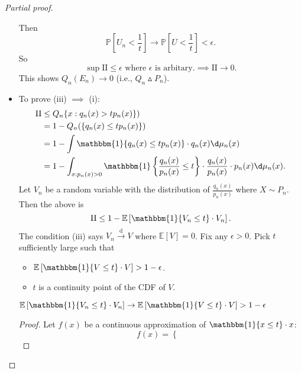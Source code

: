 \documentclass[a4paper]{article}
\begin{document}
\begin{proof}[Partial proof]
\begin{itemize}
\begin{itemize}
		\end{itemize}
		Then
		\begin{equation*}
			\mathbb{P}\left[U_n < \frac{1}{t}\right] \to \mathbb{P}\left[U < \frac{1}{t}\right] < \epsilon.
		\end{equation*}
		So
		\begin{equation*}
			\sup \text{II} \leq \epsilon \text{ where } \epsilon \text{ is arbitary.} \implies \text{II} \to 0.
		\end{equation*}
		This shows $Q_n(E_n) \to 0$ (i.e., $Q_n \vartriangle P_n$).
		\item To prove (iii) $\implies$ (i):
		\begin{equation*}
			\begin{aligned}
				\text{II} &\leq Q_n \{x:q_n(x) > tp_n(x)\}) \\
				&= 1- Q_n(\{q_n(x) \leq tp_n(x)\}) \\
				&= 1- \int \mathbbm{1}\{q_n(x) \leq tp_n(x)\} \cdot q_n(x) \d \mu_n(x) \\
				&= 1- \int_{x:p_n(x) > 0} \mathbbm{1}\left\{\frac{q_n(x)}{p_n(x)} \leq t\right\} \cdot \frac{q_n(x)}{p_n(x)} \cdot p_n(x) \d \mu_n(x).
			\end{aligned}
		\end{equation*}
		Let $V_n$ be a random variable with the distribution of $\frac{q_n(x)}{p_n(x)}$ where $X \sim P_n$. Then the above is
		\begin{equation*}
			\text{II} \leq 1- \mathbb{E}\left[\mathbbm{1}\{V_n \leq t\} \cdot V_n \right].
		\end{equation*}
		The condition (iii) says $V_n \stackrel{\text{d}}{\longrightarrow} V$ where $\mathbb{E}[V] = 0$. Fix any $\epsilon > 0$. Pick $t$ sufficiently large such that
		\begin{itemize}
			\item $\mathbb{E}\left[\mathbbm{1}\{V \leq t\} \cdot V\right] > 1-\epsilon$.
			\item $t$ is a continuity point of the CDF of $V$.
		\end{itemize}
		\begin{claim}
			$\mathbb{E}\left[\mathbbm{1}\{V_n \leq t\} \cdot V_n\right] \to \mathbb{E}\left[\mathbbm{1}\{V \leq t\} \cdot V\right] > 1-\epsilon$
		\end{claim}
		\begin{proof}
			Let $f(x)$ be a continuous approximation of $\mathbbm{1}\{x \leq t\} \cdot x$:
			\begin{equation*}
				f(x) = \left\{ \begin{array}{ll}

\end{array}
\end{equation*}
\end{proof}
\end{itemize}
\end{proof}
\end{document}
